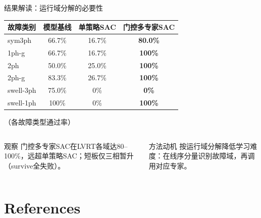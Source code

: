 \documentclass[10pt,aspectratio=169,mathserif]{beamer}
\newcommand{\warn}[1]{\textcolor{hptorange}{\textbf{#1}}}
\begin{document}
\begin{frame}{结果解读：运行域分解的必要性}
\begin{table}
\centering\small
\begin{tabular}{lccc}
\toprule
故障类别 & 模型基线 & 单策略SAC & 门控多专家SAC \\
\midrule
sym3ph & 66.7\% & 16.7\% & \textbf{80.0\%} \\
1ph-g & 66.7\% & 16.7\% & \textbf{100\%} \\
2ph & 50.0\% & 25.0\% & \textbf{100\%} \\
2ph-g & 83.3\% & 26.7\% & \textbf{100\%} \\
swell-3ph & 75.0\% & 0\% & \warn{0\%} \\
swell-1ph & 100\% & 0\% & \textbf{100\%} \\
\bottomrule
\end{tabular}
\end{table}
\centering\footnotesize（各故障类型通过率）

\begin{columns}[T,onlytextwidth]
\begin{block}{观察}
门控多专家SAC在LVRT各域达80--100\%，远超单策略SAC；短板仅三相暂升（survive全失败）。
\end{block}
\begin{block}{方法动机}
按运行域分解降低学习难度：在线序分量识别故障域，再调用对应专家。
\end{block}
\end{columns}
\end{frame}


\section{References}
\end{document}
